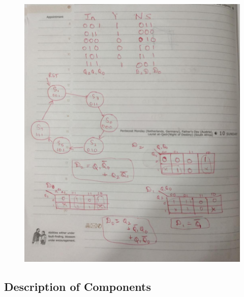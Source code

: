 \documentclass[12pt]{article}
\begin{document}
\begin{figure}[H]
\centering
  \includegraphics[scale=0.3]{Images/SeqGen_Design.jpeg}
  \caption{}
\end{figure}

\subsection{Description of Components}
\end{document}
